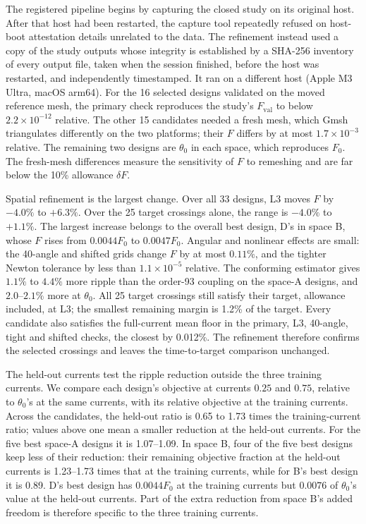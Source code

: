 The registered pipeline begins by capturing the closed study on its
original host. After that host had been restarted, the capture tool
repeatedly refused on host-boot attestation details unrelated to the
data. The refinement instead used a copy of the study outputs whose
integrity is established by a SHA-256 inventory of every output file, taken
when the session finished, before the host was restarted, and
independently timestamped. It ran on a different host (Apple M3 Ultra,
macOS arm64). For the 16 selected designs validated on the moved reference
mesh, the primary check reproduces the study's $F_{\mathrm{val}}$ to below
$2.2\times10^{-12}$ relative. The other 15 candidates needed a fresh mesh,
which Gmsh triangulates differently on the two platforms; their $F$
differs by at most $1.7\times10^{-3}$ relative. The remaining two designs
are $\theta_0$ in each space, which reproduces $F_0$. The fresh-mesh
differences measure the sensitivity of $F$ to remeshing and are far below
the 10\% allowance $\delta F$.

Spatial refinement is the largest change. Over all 33 designs, L3 moves
$F$ by $-4.0\%$ to $+6.3\%$. Over the 25 target crossings alone, the range
is $-4.0\%$ to $+1.1\%$. The largest increase belongs to the overall best
design, D's in space B, whose $F$ rises from $0.0044F_0$ to $0.0047F_0$.
Angular and nonlinear effects are small: the 40-angle and shifted grids
change $F$ by at most $0.11\%$, and the tighter Newton tolerance by less
than $1.1\times10^{-5}$ relative. The conforming estimator gives $1.1\%$ to
$4.4\%$ more ripple than the order-93 coupling on the space-A designs, and
$2.0$--$2.1\%$ more at $\theta_0$. All 25 target crossings still satisfy
their target, allowance included, at L3; the smallest remaining margin is
1.2\% of the target. Every candidate also satisfies the full-current mean
floor in the primary, L3, 40-angle, tight and shifted checks, the closest
by 0.012\%. The refinement therefore confirms the selected crossings and
leaves the time-to-target comparison unchanged.

The held-out currents test the ripple reduction outside the three training
currents. We compare each design's objective at currents $0.25$ and $0.75$,
relative to $\theta_0$'s at the same currents, with its relative objective
at the training currents. Across the candidates, the held-out ratio is 0.65
to 1.73 times the training-current ratio; values above one mean a smaller
reduction at the held-out currents. For the five best space-A designs it
is 1.07--1.09. In space B, four of the five best designs keep less of
their reduction: their remaining objective fraction at the held-out currents
is 1.23--1.73 times that at the training currents, while for B's best
design it is 0.89. D's best design has $0.0044F_0$ at the training currents but
$0.0076$ of $\theta_0$'s value at the held-out currents. Part of the extra
reduction from space B's added freedom is therefore specific to the three
training currents.

